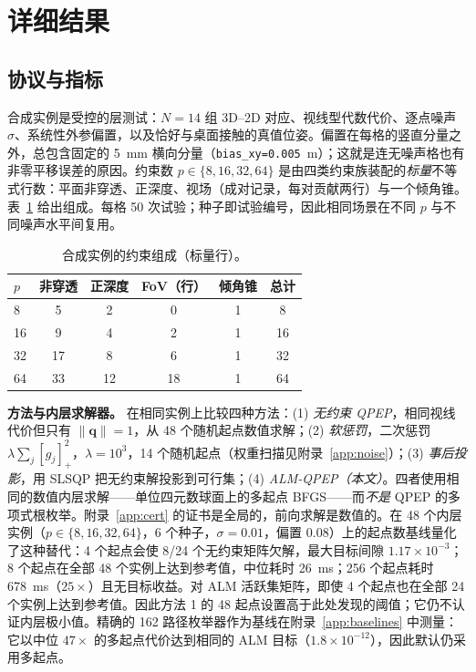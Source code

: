 \section{详细结果}\label{app:start}\label{app:details}

\subsection{协议与指标}\label{app:protocol}
合成实例是受控的层测试：$N=14$ 组 3D--2D 对应、视线型代数代价、逐点噪声 $\sigma$、系统性外参偏置，以及恰好与桌面接触的真值位姿。偏置在每格的竖直分量之外，总包含固定的 5~mm 横向分量（\texttt{bias\_xy=0.005}~m）；这就是连无噪声格也有非零平移误差的原因。约束数 $p\in\{8,16,32,64\}$ 是由四类约束族装配的\emph{标量}不等式行数：平面非穿透、正深度、视场（成对记录，每对贡献两行）与一个倾角锥。表~\ref{tab:app_comp} 给出组成。每格 50 次试验；种子即试验编号，因此相同场景在不同 $p$ 与不同噪声水平间复用。

\begin{table}[H]
\centering
\caption{合成实例的约束组成（标量行）。}
\label{tab:app_comp}
\footnotesize
\begin{tabular}{@{}lccccc@{}}
\toprule
$p$ & 非穿透 & 正深度 & FoV（行） & 倾角锥 & 总计 \\
\midrule
8 & 5 & 2 & 0 & 1 & 8 \\
16 & 9 & 4 & 2 & 1 & 16 \\
32 & 17 & 8 & 6 & 1 & 32 \\
64 & 33 & 12 & 18 & 1 & 64 \\
\bottomrule
\end{tabular}

\end{table}

\textbf{方法与内层求解器。} 在相同实例上比较四种方法：(1) \emph{无约束 QPEP}，相同视线代价但只有 $\|\mathbf q\|=1$，从 48 个随机起点数值求解；(2) \emph{软惩罚}，二次惩罚 $\lambda\sum_j[g_j]_+^2$，$\lambda=10^3$，14 个随机起点（权重扫描见附录~\ref{app:noise}）；(3) \emph{事后投影}，用 SLSQP 把无约束解投影到可行集；(4) \emph{ALM-QPEP（本文）}。四者使用相同的数值内层求解——单位四元数球面上的多起点 BFGS——而\emph{不是} QPEP 的多项式根枚举。附录~\ref{app:cert} 的证书是全局的，前向求解是数值的。在 48 个内层实例（$p\in\{8,16,32,64\}$，6 个种子，$\sigma=0.01$，偏置 $0.08$）上的起点数基线量化了这种替代：4 个起点会使 8/24 个无约束矩阵欠解，最大目标间隙 $1.17\times10^{-3}$；8 个起点在全部 48 个实例上达到参考值，中位耗时 26~ms；256 个起点耗时 678~ms（$25\times$）且无目标收益。对 ALM 活跃集矩阵，即使 4 个起点也在全部 24 个实例上达到参考值。因此方法 1 的 48 起点设置高于此处发现的阈值；它仍不认证内层极小值。精确的 162 路径枚举器作为基线在附录~\ref{app:baselines} 中测量：它以中位 $47\times$ 的多起点代价达到相同的 ALM 目标（$1.8\times10^{-12}$），因此默认仍采用多起点。

